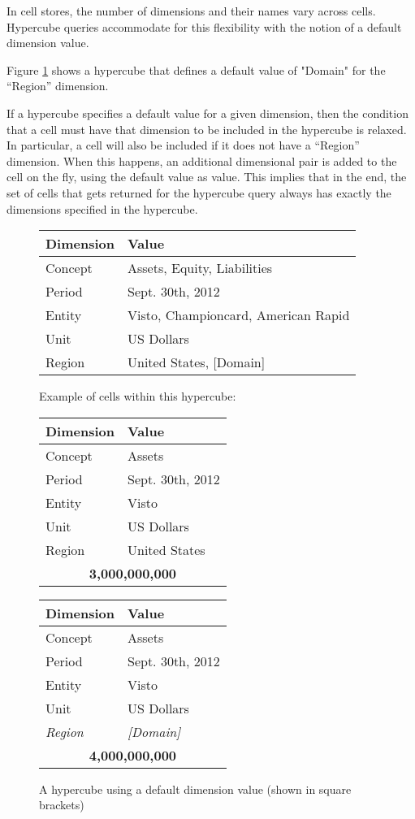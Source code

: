 \documentclass{acm_proc_article-sp}
\begin{document}
In cell stores, the number of dimensions and their names vary across cells. Hypercube queries accommodate for this flexibility with the notion of a default dimension value.

Figure \ref{fig-default} shows a hypercube that defines a default value of "Domain" for the ``Region'' dimension.

If a hypercube specifies a default value for a given dimension, then the condition that a cell must have that dimension to be included in the hypercube is relaxed. In particular, a cell will also be included if it does not have a ``Region'' dimension. When this happens, an additional dimensional pair is added to the cell on the fly, using the default value as value. This implies that in the end, the set of cells that gets returned for the hypercube query always has exactly the dimensions specified in the hypercube.

\begin{figure}
\caption{A hypercube using a default dimension value (shown in square brackets)}
\label{fig-default}
\begin{tabular}{|l|l|}
\hline
Dimension & Value \\
\hline
Concept & Assets, Equity, Liabilities \\
Period & Sept. 30th, 2012 \\
Entity & Visto, Championcard, American Rapid \\
Unit & US Dollars \\
Region & United States, [Domain] \\
\hline
\end{tabular}

Example of cells within this hypercube:

\begin{tabular}{|l|l|}
\hline
Dimension & Value \\
\hline
Concept & Assets \\
Period & Sept. 30th, 2012 \\
Entity & Visto \\
Unit & US Dollars \\
Region & United States \\
\hline
\multicolumn{2}{|c|}{\textbf{3,000,000,000}} \\
\hline
\end{tabular}

\begin{tabular}{|l|l|}
\hline
Dimension & Value \\
\hline
Concept & Assets \\
Period & Sept. 30th, 2012 \\
Entity & Visto \\
Unit & US Dollars \\
\emph{Region} & \emph{[Domain]} \\
\hline
\multicolumn{2}{|c|}{\textbf{4,000,000,000}} \\
\hline
\end{tabular}
\end{figure}
\end{document}
